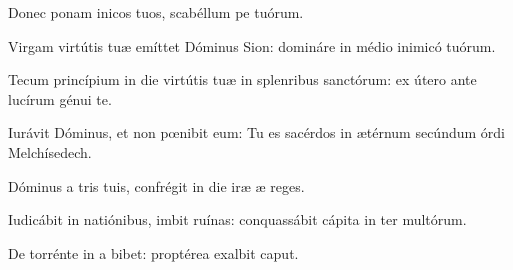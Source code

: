 \item {}

\item Donec ponam inicos tuos,\psstar{} scabéllum pe tuórum.

\item Virgam virtútis tuæ emíttet Dóminus  Sion:\psstar{} domináre in médio inimicó tuórum.

\item Tecum princípium in die virtútis tuæ in splenribus sanctórum:\psstar{} ex útero ante lucírum génui te.

\item Iurávit Dóminus, et non pœnibit eum:\psstar{} Tu es sacérdos in ætérnum secúndum órdi Melchísedech.

\item Dóminus a tris tuis,\psstar{} confrégit in die iræ æ reges.

\item Iudicábit in natiónibus, imbit ruínas:\psstar{} conquassábit cápita in ter multórum.

\item De torrénte in a bibet:\psstar{} proptérea exalbit caput.
